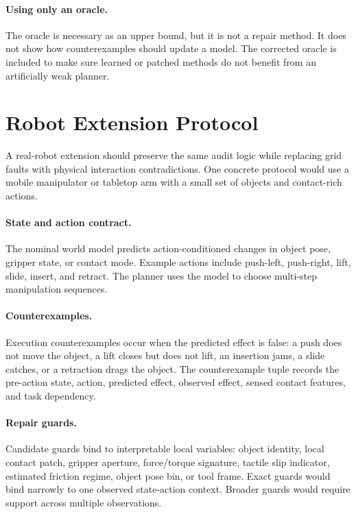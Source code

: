 \documentclass{article}
\begin{document}
\paragraph{Using only an oracle.}
The oracle is necessary as an upper bound, but it is not a repair method. It does not show how counterexamples should update a model. The corrected oracle is included to make sure learned or patched methods do not benefit from an artificially weak planner.

\section{Robot Extension Protocol}

A real-robot extension should preserve the same audit logic while replacing grid faults with physical interaction contradictions. One concrete protocol would use a mobile manipulator or tabletop arm with a small set of objects and contact-rich actions.

\paragraph{State and action contract.}
The nominal world model predicts action-conditioned changes in object pose, gripper state, or contact mode. Example actions include push-left, push-right, lift, slide, insert, and retract. The planner uses the model to choose multi-step manipulation sequences.

\paragraph{Counterexamples.}
Execution counterexamples occur when the predicted effect is false: a push does not move the object, a lift closes but does not lift, an insertion jams, a slide catches, or a retraction drags the object. The counterexample tuple records the pre-action state, action, predicted effect, observed effect, sensed contact features, and task dependency.

\paragraph{Repair guards.}
Candidate guards bind to interpretable local variables: object identity, local contact patch, gripper aperture, force/torque signature, tactile slip indicator, estimated friction regime, object pose bin, or tool frame. Exact guards would bind narrowly to one observed state-action context. Broader guards would require support across multiple observations.
\end{document}
